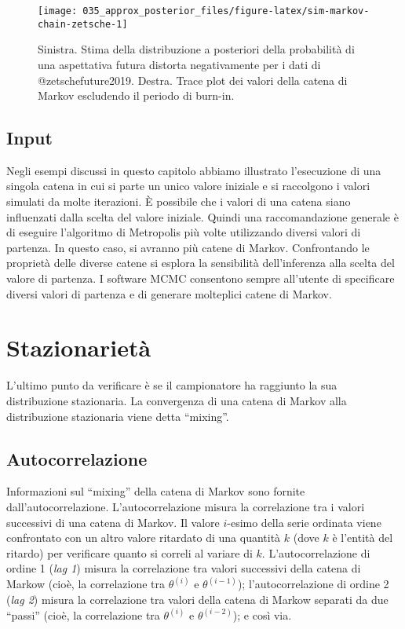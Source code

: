 \documentclass[
]{memoir}
\begin{document}
\begin{figure}

{\centering \texttt{[image: 035\_approx\_posterior\_files/figure-latex/sim-markov-chain-zetsche-1]} 

}

\caption{Sinistra. Stima della distribuzione a posteriori della probabilità di una aspettativa futura distorta negativamente per i dati di @zetschefuture2019. Destra. Trace plot dei valori della catena di Markov escludendo il periodo di burn-in.}\label{fig:sim-markov-chain-zetsche}
\end{figure}

\hypertarget{input}{%
\subsection{Input}\label{input}}

Negli esempi discussi in questo capitolo abbiamo illustrato l'esecuzione di una singola catena in cui si parte un unico valore iniziale e si raccolgono i valori simulati da molte iterazioni. È possibile che i valori di una catena siano influenzati dalla scelta del valore iniziale. Quindi una raccomandazione generale è di eseguire l'algoritmo di Metropolis più volte utilizzando diversi valori di partenza. In questo caso, si avranno più catene di Markov. Confrontando le proprietà delle diverse catene si esplora la sensibilità dell'inferenza alla scelta del valore di partenza. I software MCMC consentono sempre all'utente di specificare diversi valori di partenza e di generare molteplici catene di Markov.

\hypertarget{stazionarietuxe0}{%
\section{Stazionarietà}\label{stazionarietuxe0}}

L'ultimo punto da verificare è se il campionatore ha raggiunto la sua distribuzione stazionaria. La convergenza di una catena di Markov alla distribuzione stazionaria viene detta ``mixing''.

\hypertarget{approx-post-autocor}{%
\subsection{Autocorrelazione}\label{approx-post-autocor}}

Informazioni sul ``mixing'' della catena di Markov sono fornite dall'autocorrelazione. L'autocorrelazione misura la correlazione tra i valori successivi di una catena di Markov. Il valore \(i\)-esimo della serie ordinata viene confrontato con un altro valore ritardato di una quantità \(k\) (dove \(k\) è l'entità del ritardo) per verificare quanto si correli al variare di \(k\). L'autocorrelazione di ordine 1 (\emph{lag 1}) misura la correlazione tra valori successivi della catena di Markow (cioè, la correlazione tra \(\theta^{(i)}\) e \(\theta^{(i-1)}\)); l'autocorrelazione di ordine 2 (\emph{lag 2}) misura la correlazione tra valori della catena di Markow separati da due ``passi'' (cioè, la correlazione tra \(\theta^{(i)}\) e \(\theta^{(i-2)}\)); e così via.
\end{document}
